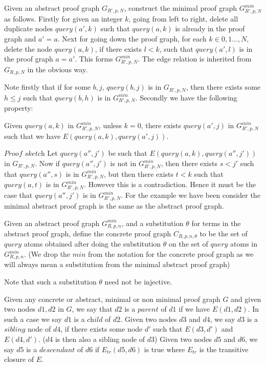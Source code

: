 \begin{definition}\label{minabsgraph}
Given an abstract proof graph $G_{R',p,N}$, construct the minimal proof graph $G_{R',p,N}^{min}$ as follows. Firstly for given an integer $k$, going from left to right, delete all duplicate nodes $query(a',k)$ such that $query(a,k)$ is already in the proof graph and $a'=a$. Next for going down the proof graph, for each $k\in {0,1...,N}$, delete the node $query(a,k)$, if there exists $l<k$, such that $query(a',l)$ is in the proof graph $a=a'$. This forms $G_{R',p,N}^{min}$. The edge relation is inherited from $G_{R,p,N}$ in the obvious way. 
\end{definition}
Note firstly that if for some $b,j$, $query(b,j)$ is in $G_{R',p,N}$, then there exists some $h\leq j$ such that $query(b,h)$ is in $G_{R',p,N}^{min}$. Secondly we have the following property:
\begin{lemma}
Given $query(a,k)$ in $G_{R',p,N}^{min}$, unless $k=0$, there exists $query(a',j)$ in $G_{R',p,N}^{min}$ such that we have $E(query(a,k),query(a',j))$.  
\end{lemma}
$\textit{Proof sketch}$ Let $query(a'',j')$ be such that $E(query(a,k),query(a'',j'))$ in $G_{R',p,N}$. Now if $query(a'',j')$ is not in $G_{R',p,N}^{min}$, then there exists $s<j'$ such that $query(a'',s)$ is in $G_{R',p,N}^{min}$, but then there exists $t<k$ such that $query(a,t)$ is in $G_{R',p,N}^{min}$. However this is a contradiction. Hence it must be the case that $query(a'',j')$ is in $G_{R',p,N}^{min}$. 
For the example we have been consider the minimal abstract proof graph is the same as the abstract proof graph.
\begin{definition}\label{def:concretegraph}
Given an abstract proof graph $G_{R,p,n}^{min}$, and a substitution $\theta$ for
terms in the abstract proof graph, define the concrete proof graph
$C_{R,p,n,\theta}$ to be the set of $query$ atoms obtained after doing the
substitution $\theta$ on the set of $query$ atoms in $G_{R,p,n}^{min}$. (We drop the $min$ from the notation for the concrete proof graph as we will always mean a substitution from the minimal abstract proof graph)
\end{definition}
Note that such a substitution $\theta$ need not be injective.\\
\begin{definition}
Given any concrete or abstract, minimal or non minimal proof graph $G$ and given two nodes $d1,d2$ in $G$, we say that $d2$ is a $\textit{parent}$ of $d1$ if we have $E(d1,d2)$. In such a case we say $d1$ is a $\textit{child}$ of $d2$. Given two nodes $d3$ and $d4$, we say $d3$ is a $\textit{sibling}$ node of $d4$, if there exists some node $d'$ such that $E(d3,d')$ and $E(d4,d')$. ($d4$ is then also a sibling node of $d3$) Given two nodes $d5$ and $d6$, we say $d5$ is a $\textit{descendant}$ of $d6$ if $E_{tr}(d5,d6)$ is true where $E_{tr}$ is the transitive closure of $E$. 
\end{definition} 
